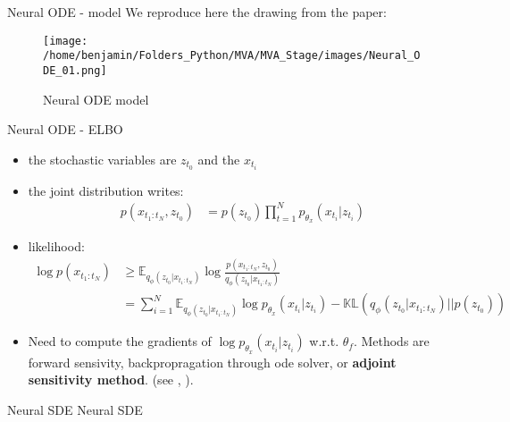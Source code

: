 \begin{frame}{Neural ODE - model}
    We reproduce here the drawing from the paper:
    \begin{figure}[H]
        \centering
        \texttt{[image: /home/benjamin/Folders\_Python/MVA/MVA\_Stage/images/Neural\_ODE\_01.png]}
        \caption{Neural ODE model}
        \label{fig:Neural ODE}
    \end{figure}
\end{frame}

\begin{frame}{Neural ODE - ELBO}
    \begin{itemize}
        \item the stochastic variables are $z_{t_0}$ and the $x_{t_i}$
        \item the joint distribution writes:
            \begin{align}
                p(x_{t_1:t_N}, z_{t_0}) 
                &= p(z_{t_0}) \prod_{t=1}^{N}p_{\theta_x}(x_{t_i} \vert z_{t_i})
            \end{align}
        \item likelihood:
        \begin{align}
            \log{p(x_{t_1:t_N})} 
            &\geq \mathbb{E}_{q_{\phi}(z_{t_0} \vert x_{t_1:t_N})} \log{\frac{p(x_{t_1:t_N}, z_{t_0})}{q_{\phi}(z_{t_0}\vert x_{t_1:t_N})}} \\
                &= \sum_{i=1}^{N} \mathbb{E}_{q_{\phi}(z_{t_0} \vert x_{t_1:t_N})} \log{p_{\theta_x}(x_{t_i} \vert z_{t_i})} - \mathbb{KL}(q_{\phi}(z_{t_0} \vert x_{t_1:t_N}) \vert\vert p(z_{t_0}))
        \end{align}
        \item Need to compute the gradients of $\log{p_{\theta_x}(x_{t_i} \vert z_{t_i})}$ w.r.t. $\theta_f$. 
        Methods are forward sensivity, backpropragation through \gls{ode} solver, or \textbf{adjoint sensitivity method}.
        (see \cite{pontriagin_mathematical_2018}, \cite{sengupta_efficient_2014}).
    \end{itemize}
\end{frame}


\begin{frame}{Neural SDE}
    Neural SDE
\end{frame}